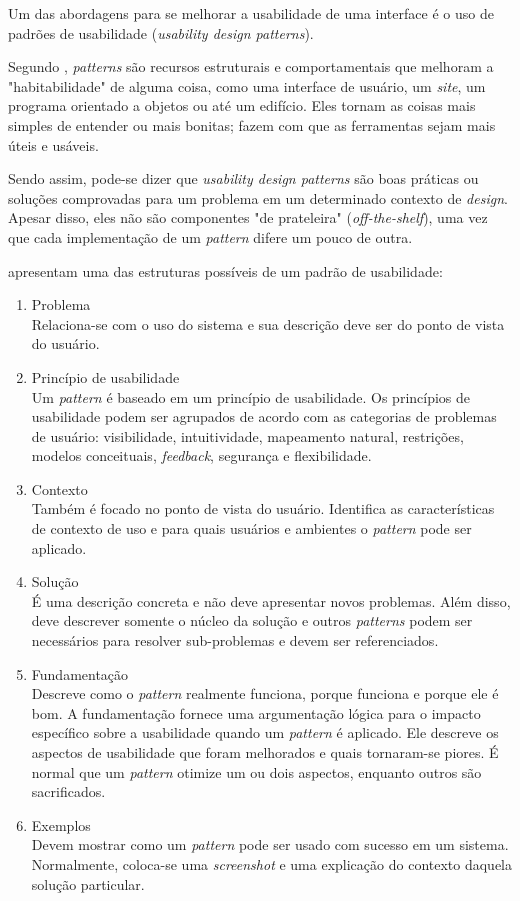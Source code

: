 Um das abordagens para se melhorar a usabilidade de uma interface é o uso de padrões de usabilidade (\textit{usability design patterns}).

Segundo , \textit{patterns} são recursos estruturais e comportamentais que melhoram a "habitabilidade" de alguma coisa, como uma interface de usuário, um \textit{site}, um programa orientado a objetos ou até um edifício. Eles tornam as coisas mais simples de entender ou mais bonitas; fazem com que as ferramentas sejam mais úteis e usáveis.

Sendo assim, pode-se dizer que \textit{usability design patterns} são boas práticas ou soluções comprovadas para um problema em um determinado contexto de \textit{design}. Apesar disso, eles não são componentes "de prateleira" (\textit{off-the-shelf}), uma vez que cada implementação de um \textit{pattern} difere um pouco de outra. 

 apresentam uma das estruturas possíveis de um padrão de usabilidade:
    \begin{enumerate}
        \item Problema \\
            Relaciona-se com o uso do sistema e sua descrição deve ser do ponto de vista do usuário.
        \item Princípio de usabilidade \\
            Um \textit{pattern} é baseado em um princípio de usabilidade. Os princípios de usabilidade podem ser agrupados de acordo com as categorias de problemas de usuário: visibilidade, intuitividade, mapeamento natural, restrições, modelos conceituais, \textit{feedback}, segurança e flexibilidade.
        \item Contexto \\
            Também é focado no ponto de vista do usuário. Identifica as características de contexto de uso e para quais usuários e ambientes o \textit{pattern} pode ser aplicado.
        \item Solução \\
            É uma descrição concreta e não deve apresentar novos problemas. Além disso, deve descrever somente o núcleo da solução e outros \textit{patterns} podem ser necessários para resolver sub-problemas e devem ser referenciados.
        \item Fundamentação \\
            Descreve como o \textit{pattern} realmente funciona, porque funciona e porque ele é bom. A fundamentação fornece uma argumentação lógica para o impacto específico sobre a usabilidade quando um \textit{pattern} é aplicado. Ele descreve os aspectos de usabilidade que foram melhorados e quais tornaram-se piores. É normal que um \textit{pattern} otimize um ou dois aspectos, enquanto outros são sacrificados.
        \item Exemplos \\
            Devem mostrar como um \textit{pattern} pode ser usado com sucesso em um sistema. Normalmente, coloca-se uma \textit{screenshot} e uma explicação do contexto daquela solução particular.
    \end{enumerate}

